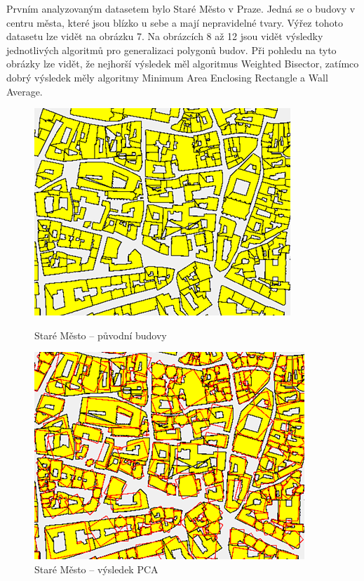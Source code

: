 \documentclass{article}
\begin{document}
\begin{spacing}{1.5}
\newpage
Prvním analyzovaným datasetem bylo Staré Město v Praze. Jedná se o budovy v centru města, které jsou blízko u sebe a mají nepravidelné tvary. Výřez tohoto datasetu lze vidět na obrázku 7. Na obrázcích 8 až 12 jsou vidět výsledky jednotlivých algoritmů pro generalizaci polygonů budov. Při pohledu na tyto obrázky lze vidět, že nejhorší výsledek měl algoritmus Weighted Bisector, zatímco dobrý výsledek měly algoritmy Minimum Area Enclosing Rectangle a Wall Average.

\begin{figure}[htbp]
  \centering
  \begin{minipage}[b]{0.37\textwidth}
    \includegraphics[width=\textwidth]{images/SM_orig.png}
    \caption{Staré Město – původní budovy}
  \end{minipage}
  \hfill
  \begin{minipage}[b]{0.37\textwidth}
    \includegraphics[width=\textwidth]{images/SM_pca.png}
    \caption{Staré Město – výsledek PCA}
  \end{minipage}
\end{figure}


\end{spacing}
\end{document}
